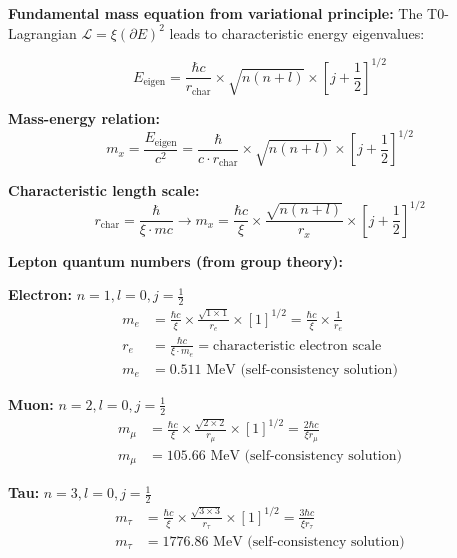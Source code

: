 \documentclass[12pt,a4paper]{article}
\numberwithin{equation}{section}
\newcommand{\xipar}{\xi}
\newcommand{\calL}{\mathcal{L}}
\begin{document}
	\textbf{Fundamental mass equation from variational principle:}
	The T0-Lagrangian $\calL = \xipar(\partial E)^2$ leads to characteristic energy eigenvalues:
	
	\begin{equation}
		E_{\text{eigen}} = \frac{\hbar c}{r_{\text{char}}} \times \sqrt{n(n+l)} \times [j+\frac{1}{2}]^{1/2}
		\label{eq:energy_eigenvalues}
	\end{equation}
	
	\textbf{Mass-energy relation:}
	\begin{equation}
		m_x = \frac{E_{\text{eigen}}}{c^2} = \frac{\hbar}{c \cdot r_{\text{char}}} \times \sqrt{n(n+l)} \times [j+\frac{1}{2}]^{1/2}
		\label{eq:mass_energy}
	\end{equation}
	
	\textbf{Characteristic length scale:}
	\begin{equation}
		r_{\text{char}} = \frac{\hbar}{\xipar \cdot mc} \rightarrow m_x = \frac{\hbar c}{\xipar} \times \frac{\sqrt{n(n+l)}}{r_x} \times [j+\frac{1}{2}]^{1/2}
		\label{eq:characteristic_length}
	\end{equation}
	
	\textbf{Lepton quantum numbers (from group theory):}
	
	\textbf{Electron:} $n=1, l=0, j=\frac{1}{2}$
	\begin{align}
		m_e &= \frac{\hbar c}{\xipar} \times \frac{\sqrt{1 \times 1}}{r_e} \times [1]^{1/2} = \frac{\hbar c}{\xipar} \times \frac{1}{r_e}\\
		r_e &= \frac{\hbar c}{\xipar \cdot m_e} = \text{characteristic electron scale}\\
		m_e &= 0.511 \text{ MeV (self-consistency solution)}
		\label{eq:electron_mass}
	\end{align}
	
	\textbf{Muon:} $n=2, l=0, j=\frac{1}{2}$
	\begin{align}
		m_\mu &= \frac{\hbar c}{\xipar} \times \frac{\sqrt{2 \times 2}}{r_\mu} \times [1]^{1/2} = \frac{2\hbar c}{\xipar r_\mu}\\
		m_\mu &= 105.66 \text{ MeV (self-consistency solution)}
		\label{eq:muon_mass}
	\end{align}
	
	\textbf{Tau:} $n=3, l=0, j=\frac{1}{2}$
	\begin{align}
		m_\tau &= \frac{\hbar c}{\xipar} \times \frac{\sqrt{3 \times 3}}{r_\tau} \times [1]^{1/2} = \frac{3\hbar c}{\xipar r_\tau}\\
		m_\tau &= 1776.86 \text{ MeV (self-consistency solution)}
		\label{eq:tau_mass}
	\end{align}
	
\end{document}
